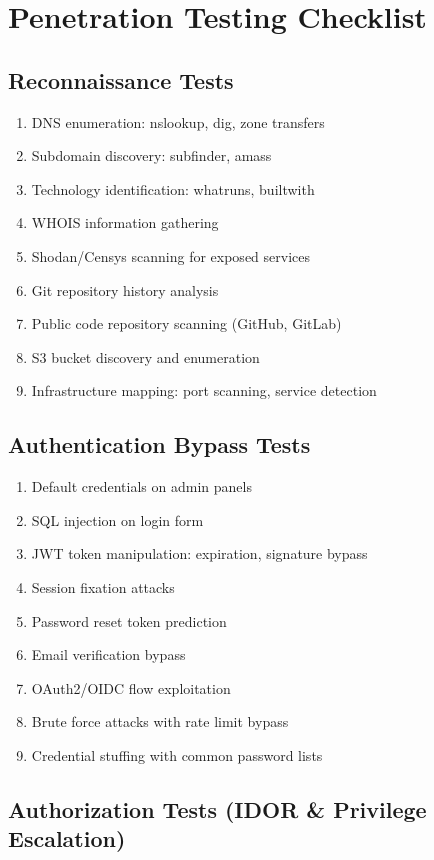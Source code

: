 \documentclass{report}
\begin{document}
\chapter{Penetration Testing Checklist}

\section{Reconnaissance Tests}

\begin{enumerate}
\item DNS enumeration: nslookup, dig, zone transfers
\item Subdomain discovery: subfinder, amass
\item Technology identification: whatruns, builtwith
\item WHOIS information gathering
\item Shodan/Censys scanning for exposed services
\item Git repository history analysis
\item Public code repository scanning (GitHub, GitLab)
\item S3 bucket discovery and enumeration
\item Infrastructure mapping: port scanning, service detection
\end{enumerate}

\section{Authentication Bypass Tests}

\begin{enumerate}
\item Default credentials on admin panels
\item SQL injection on login form
\item JWT token manipulation: expiration, signature bypass
\item Session fixation attacks
\item Password reset token prediction
\item Email verification bypass
\item OAuth2/OIDC flow exploitation
\item Brute force attacks with rate limit bypass
\item Credential stuffing with common password lists
\end{enumerate}

\section{Authorization Tests (IDOR \& Privilege Escalation)}
\end{document}
